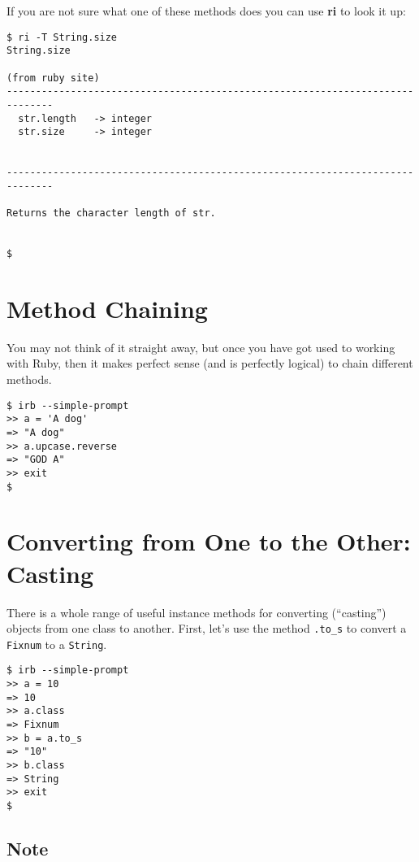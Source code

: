 \documentclass[a4paper]{book}
\begin{document}
If you are not sure what one of these methods does you can use \textbf{ri} to look it up:

\begin{shaded}\begin{verbatim}
$ ri -T String.size
String.size

(from ruby site)
------------------------------------------------------------------------------
  str.length   -> integer
  str.size     -> integer


------------------------------------------------------------------------------

Returns the character length of str.


$
\end{verbatim}\end{shaded}

\section{Method Chaining}\label{method-chaining}

You may not think of it straight away, but once you have got used to working with Ruby, then it makes perfect sense (and is perfectly logical) to chain different methods.

\begin{shaded}\begin{verbatim}
$ irb --simple-prompt
>> a = 'A dog'
=> "A dog"
>> a.upcase.reverse
=> "GOD A"
>> exit
$
\end{verbatim}\end{shaded}

\section{Converting from One to the Other: Casting}\label{converting-from-one-to-the-other-casting}

There is a whole range of useful instance methods for converting (“casting”) objects from one class to another. First, let's use the method \texttt{.to\_s} to convert a \texttt{Fixnum} to a \texttt{String}.

\begin{shaded}\begin{verbatim}
$ irb --simple-prompt
>> a = 10
=> 10
>> a.class
=> Fixnum
>> b = a.to_s
=> "10"
>> b.class
=> String
>> exit
$
\end{verbatim}\end{shaded}

\subsection{Note}\label{note-8}
\end{document}
